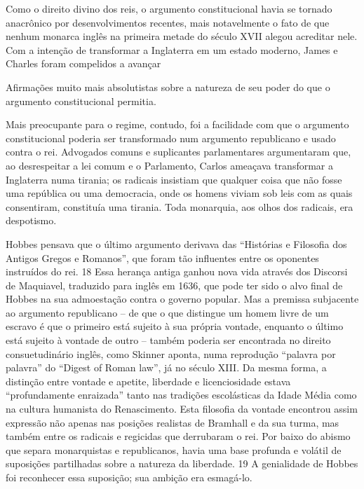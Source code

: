  \par 
Como o direito divino dos reis, o argumento constitucional havia se tornado anacrônico por desenvolvimentos recentes, mais notavelmente o fato de que nenhum monarca inglês na primeira metade do século XVII alegou acreditar nele. Com a intenção de transformar a Inglaterra em um estado moderno, James e Charles foram compelidos a avançar
 \par 
Afirmações muito mais absolutistas sobre a natureza de seu poder do que o argumento constitucional permitia.
 \par 
Mais preocupante para o regime, contudo, foi a facilidade com que o argumento constitucional poderia ser transformado num argumento republicano e usado contra o rei. Advogados comuns e suplicantes parlamentares argumentaram que, ao desrespeitar a lei comum e o Parlamento, Carlos ameaçava transformar a Inglaterra numa tirania; os radicais insistiam que qualquer coisa que não fosse uma república ou uma democracia, onde os homens viviam sob leis com as quais consentiram, constituía uma tirania. Toda monarquia, aos olhos dos radicais, era despotismo.
 \par 
Hobbes pensava que o último argumento derivava das “Histórias e Filosofia dos Antigos Gregos e Romanos”, que foram tão influentes entre os oponentes instruídos do rei. {\color{blue}18} Essa herança antiga ganhou nova vida através dos Discorsi de Maquiavel, traduzido para inglês em 1636, que pode ter sido o alvo final de Hobbes na sua admoestação contra o governo popular. Mas a premissa subjacente ao argumento republicano – de que o que distingue um homem livre de um escravo é que o primeiro está sujeito à sua própria vontade, enquanto o último está sujeito à vontade de outro – também poderia ser encontrada no direito consuetudinário inglês, como Skinner aponta, numa reprodução “palavra por palavra” do “Digest of Roman law”, já no século XIII. Da mesma forma, a distinção entre vontade e apetite, liberdade e licenciosidade estava “profundamente enraizada” tanto nas tradições escolásticas da Idade Média como na cultura humanista do Renascimento. Esta filosofia da vontade encontrou assim expressão não apenas nas posições realistas de Bramhall e da sua turma, mas também entre os radicais e regicidas que derrubaram o rei. Por baixo do abismo que separa monarquistas e republicanos, havia uma base profunda e volátil de suposições partilhadas sobre a natureza da liberdade. {\color{blue}19} A genialidade de Hobbes foi reconhecer essa suposição; sua ambição era esmagá-lo.
 \par 
